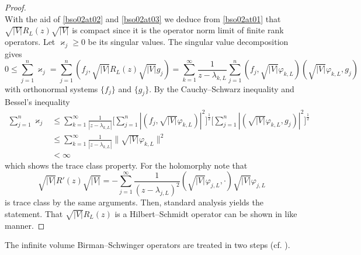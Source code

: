 \begin{proof}
\begin{equation}
\end{equation}
With the aid of \eqref{bso02at02} and \eqref{bso02at03} we deduce from \eqref{bso02at01}
that $\sqrt{|V|}R_L(z)\sqrt{|V|}$ is compact since it is the operator norm limit of finite rank operators. 
Let $\varkappa_j\geq 0$ be its singular values. The singular value decomposition gives
\begin{equation*}
  0 \leq \sum_{j=1}^n \varkappa_j
       = \sum_{j=1}^n (f_j, \sqrt{|V|}R_L(z)\sqrt{|V|} g_j)
       = \sum_{k=1}^\infty \frac{1}{z-\lambda_{k,L}}
           \sum_{j=1}^n (f_j,\sqrt{|V|}\varphi_{k,L})(\sqrt{|V|}\varphi_{k,L},g_j)
\end{equation*}
with orthonormal systems $\{f_j\}$ and $\{g_j\}$. By the Cauchy--Schwarz inequality and Bessel's inequality 
\begin{equation*}
\begin{split}
  \sum_{j=1}^n \varkappa_j
    & \leq \sum_{k=1}^\infty \frac{1}{|z-\lambda_{k,L}|}
           \Big[\sum_{j=1}^n |(f_j,\sqrt{|V|}\varphi_{k,L})|^2\Big]^{\frac{1}{2}}
           \Big[\sum_{j=1}^n |(\sqrt{|V|}\varphi_{k,L},g_j)|^2\Big]^{\frac{1}{2}} \\
    & \leq \sum_{k=1}^\infty \frac{1}{|z-\lambda_{k,L}|} \|\sqrt{|V|}\varphi_{k,L}\|^2 \\
    & < \infty
\end{split}
\end{equation*}
which shows the trace class property. For the holomorphy note that
\begin{equation*}
  \sqrt{|V|}R'(z)\sqrt{|V|} = -\sum_{j=1}^\infty \frac{1}{(z-\lambda_{j,L})^2} (\sqrt{|V|}\varphi_{j,L},\cdot)\sqrt{|V|}\varphi_{j,L}
\end{equation*}
is trace class by the same arguments. Then, standard analysis yields the statement.
That $\sqrt{|V|}R_L(z)$ is a Hilbert--Schmidt operator can be shown in like manner.
\end{proof}

The infinite volume Birman--Schwinger operators are treated in two steps (cf. \cite{Froese1997}).

